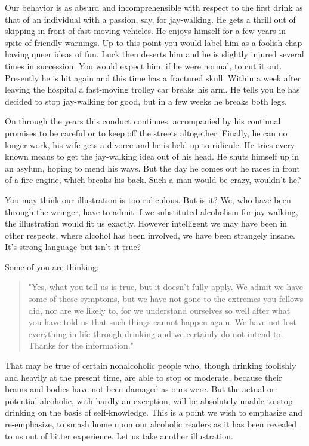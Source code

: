 \begin{biblechapter}

Our behavior is as absurd and incomprehensible with respect to the first drink 
as that of an individual with a passion, say, for jay-walking. 
He gets a thrill out of skipping in front of fast-moving vehicles. 
He enjoys himself for a few years in spite of friendly warnings. 
Up to this point you would label him as a foolish chap having queer ideas of fun. 
Luck then deserts him and he is slightly injured several times in succession. 
You would expect him, if he were normal, to cut it out. 
Presently he is hit again and this time has a fractured skull. 
Within a week after leaving the hospital a fast-moving trolley car breaks his arm. 
He tells you he has decided to stop jay-walking for good, 
but in a few weeks he breaks both legs.

On through the years this conduct continues, 
accompanied by his continual promises to be careful 
or to keep off the streets altogether. 
Finally, he can no longer work, 
his wife gets a divorce and he is held up to ridicule. 
He tries every known means to get the jay-walking idea out of his head. 
He shuts himself up in an asylum, hoping to mend his ways. 
But the day he comes out he races in front of a fire engine, 
which breaks his back. 
Such a man would be crazy, wouldn't he?

You may think our illustration is too ridiculous. 
But is it? 
We, who have been through the wringer, 
have to admit if we substituted alcoholism for jay-walking, 
the illustration would fit us exactly. 
However intelligent we may have been in other respects, 
where alcohol has been involved, we have been strangely insane. 
It's strong language-but isn't it true?
\end{biblechapter}


\begin{biblechapter}

Some of you are thinking: 
\begin{quote}
"Yes, what you tell us is true, but it doesn't fully apply. 
We admit we have some of these symptoms, 
but we have not gone to the extremes you fellows did, 
nor are we likely to, 
for we understand ourselves so well after what you have told us 
that such things cannot happen again. 
We have not lost everything in life through drinking and we certainly do not intend to. 
Thanks for the information."
\end{quote}

That may be true of certain nonalcoholic people who, 
though drinking foolishly and heavily at the present time, 
are able to stop or moderate, 
because their brains and bodies have not been damaged as ours were. 
But the actual or potential alcoholic, with hardly an exception, 
will be absolutely unable to stop drinking on the basis of self-knowledge. 
This is a point we wish to emphasize and re-emphasize, 
to smash home upon our alcoholic readers 
as it has been revealed to us out of bitter experience. 
Let us take another illustration.
\end{biblechapter}


